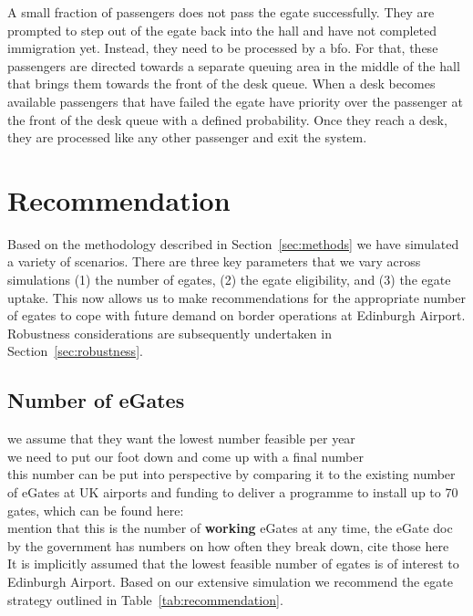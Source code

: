 \documentclass[10pt]{article}
\begin{document}
A small fraction of passengers does not pass the \gls{egate} successfully. They are prompted to step out of the \gls{egate} back into the hall and have not completed immigration yet. Instead, they need to be processed by a \gls{bfo}. For that, these passengers are directed towards a separate queuing area in the middle of the hall that brings them towards the front of the desk queue. When a desk becomes available passengers that have failed the \gls{egate} have priority over the passenger at the front of the desk queue with a defined probability. Once they reach a desk, they are processed like any other passenger and exit the system.



\section{Recommendation}

Based on the methodology described in Section~\ref{sec:methods} we have simulated a variety of scenarios. There are three key parameters that we vary across simulations (1) the number of \glspl{egate}, (2) the \gls{egate} eligibility, and (3) the \gls{egate} uptake. This now allows us to make recommendations for the appropriate number of \glspl{egate} to cope with future demand on border operations at Edinburgh Airport. Robustness considerations are subsequently undertaken in Section~\ref{sec:robustness}. 

\subsection{Number of eGates}
we assume that they want the lowest number feasible per year \\
we need to put our foot down and come up with a final number \\ 
this number can be put into perspective by comparing it to the existing number of eGates at UK airports and funding to  deliver a programme to install up to 70 gates, which can be found here: \cite{Inspection_eGates} \\
mention that this is the number of \textbf{working} eGates at any time, the eGate doc by the government has numbers on how often they break down, cite those here \\

It is implicitly assumed that the lowest feasible number of \glspl{egate} is of interest to Edinburgh Airport. Based on our extensive simulation we recommend the \gls{egate} strategy outlined in Table~\ref{tab:recommendation}. 
\end{document}
